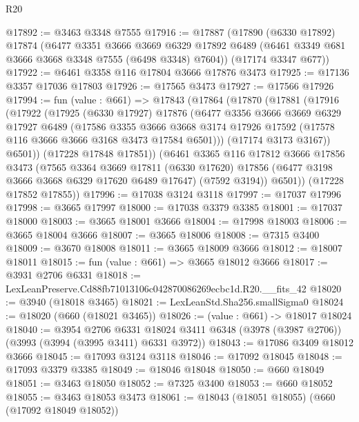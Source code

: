 \begin{lexlean}{R20}
\begin{coremodule}
@17892 := @3463 @3348 @7555
@17916 := @17887
    (@17890
      (@6330 @17892)
      @17874
      (@6477
        @3351
        @3666
        @3669
        @6329
        @17892
        @6489
        (@6461 @3349 @681 @3666 @3668 @3348 @7555 (@6498 @3348) @7604))
      (@17174 @3347 @677))
@17922 := @6461 @3358 @116 @17804 @3666 @17876 @3473
@17925 := @17136 @3357 @17036 @17803
@17926 := @17565 @3473
@17927 := @17566 @17926
@17994 := fun (value : @661) =>
  @17843
    (@17864
      (@17870
        (@17881
          (@17916
            (@17922
              (@17925
                (@6330 @17927)
                @17876
                (@6477
                  @3356
                  @3666
                  @3669
                  @6329
                  @17927
                  @6489
                  (@17586
                    @3355
                    @3666
                    @3668
                    @3174
                    @17926
                    @17592
                    (@17578 @116 @3666 @3666 @3168 @3473 @17584 @6501)))
                (@17174 @3173 @3167))
              @6501))
          (@17228 @17848 @17851))
        (@6461
          @3365
          @116
          @17812
          @3666
          @17856
          @3473
          (@7565
            @3364
            @3669
            @17811
            (@6330 @17620)
            @17856
            (@6477 @3198 @3666 @3668 @6329 @17620 @6489 @17647)
            (@7592 @3194))
          @6501))
      (@17228 @17852 @17855))
@17996 := @17038 @3124 @3118
@17997 := @17037 @17996
@17998 := @3665 @17997
@18000 := @17038 @3379 @3385
@18001 := @17037 @18000
@18003 := @3665 @18001 @3666
@18004 := @17998 @18003
@18006 := @3665 @18004 @3666
@18007 := @3665 @18006
@18008 := @7315 @3400
@18009 := @3670 @18008
@18011 := @3665 @18009 @3666
@18012 := @18007 @18011
@18015 := fun (value : @661) => @3665 @18012 @3666
@18017 := @3931 @2706 @6331
@18018 := LexLeanPreserve.Cd88fb71013106c042870086269ecbc1d.R20.__fits_42
@18020 := @3940 (@18018 @3465)
@18021 := LexLeanStd.Sha256.smallSigma0
@18024 := @18020 (@660 (@18021 @3465))
@18026 := (value : @661) -> @18017 @18024
@18040 := @3954
    @2706
    @6331
    @18024
    @3411
    @6348
    (@3978 (@3987 @2706))
    (@3993 (@3994 (@3995 @3411) @6331 @3972))
@18043 := @17086 @3409 @18012 @3666
@18045 := @17093 @3124 @3118
@18046 := @17092 @18045
@18048 := @17093 @3379 @3385
@18049 := @18046 @18048
@18050 := @660 @18049
@18051 := @3463 @18050
@18052 := @7325 @3400
@18053 := @660 @18052
@18055 := @3463 @18053 @3473
@18061 := @18043 (@18051 @18055) (@660 (@17092 @18049 @18052))

\end{coremodule}
\end{lexlean}
